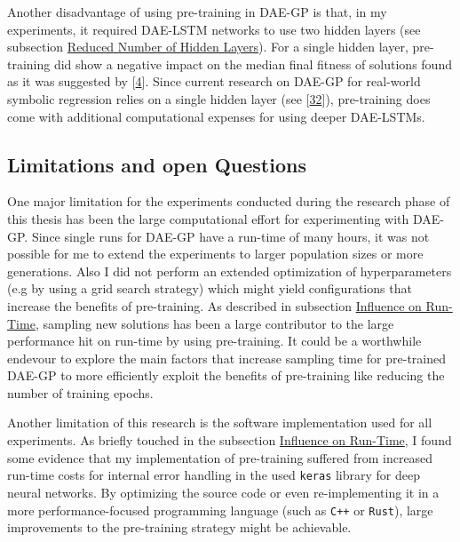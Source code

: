 \documentclass[
  11pt,
]{article}
\begin{document}
Another disadvantage of using pre-training in DAE-GP is that, in my experiments, it required DAE-LSTM networks to use two hidden layers (see subsection \protect\hyperlink{reduced-number-of-hidden-layers}{Reduced Number of Hidden Layers}). For a single hidden layer, pre-training did show a negative impact on the median final fitness of solutions found as it was suggested by {[}\protect\hyperlink{ref-pmlr-v9-erhan10a}{4}{]}. Since current research on DAE-GP for real-world symbolic regression relies on a single hidden layer (see {[}\protect\hyperlink{ref-dae-gp_2022_symreg}{32}{]}), pre-training does come with additional computational expenses for using deeper DAE-LSTMs.

\hypertarget{limitations-and-open-questions}{%
\subsection{Limitations and open Questions}\label{limitations-and-open-questions}}

One major limitation for the experiments conducted during the research phase of this thesis has been the large computational effort for experimenting with DAE-GP. Since single runs for DAE-GP have a run-time of many hours, it was not possible for me to extend the experiments to larger population sizes or more generations. Also I did not perform an extended optimization of hyperparameters (e.g by using a grid search strategy) which might yield configurations that increase the benefits of pre-training. As described in subsection \protect\hyperlink{influence-on-run-time}{Influence on Run-Time}, sampling new solutions has been a large contributor to the large performance hit on run-time by using pre-training. It could be a worthwhile endevour to explore the main factors that increase sampling time for pre-trained DAE-GP to more efficiently exploit the benefits of pre-training like reducing the number of training epochs.

Another limitation of this research is the software implementation used for all experiments. As briefly touched in the subsection \protect\hyperlink{influence-on-run-time}{Influence on Run-Time}, I found some evidence that my implementation of pre-training suffered from increased run-time costs for internal error handling in the used \texttt{keras} library for deep neural networks. By optimizing the source code or even re-implementing it in a more performance-focused programming language (such as \texttt{C++} or \texttt{Rust}), large improvements to the pre-training strategy might be achievable.
\end{document}
